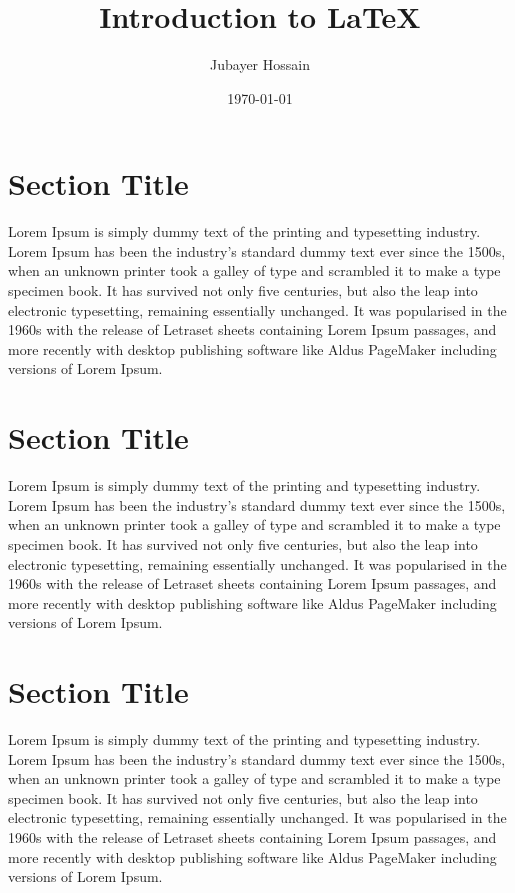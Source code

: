 \documentclass{article}
\title{Introduction to {\LaTeX}}
\author{Jubayer Hossain}
\date{\today}
\begin{document}
\maketitle 
\tableofcontents 

\section{Section Title} 
Lorem Ipsum is simply dummy text of the printing and typesetting industry. 
Lorem Ipsum has been the industry's standard dummy text ever since the 1500s, 
when an unknown printer took a galley of type and scrambled it to make a type 
specimen book. It has survived not only five centuries, but also the leap into 
electronic typesetting, remaining essentially unchanged. It was popularised in 
the 1960s with the release of Letraset sheets containing Lorem Ipsum passages, 
and more recently with desktop publishing software like Aldus PageMaker 
including versions of Lorem Ipsum.

\section{Section Title} 
Lorem Ipsum is simply dummy text of the printing and typesetting industry. 
Lorem Ipsum has been the industry's standard dummy text ever since the 1500s, 
when an unknown printer took a galley of type and scrambled it to make a type 
specimen book. It has survived not only five centuries, but also the leap into 
electronic typesetting, remaining essentially unchanged. It was popularised in 
the 1960s with the release of Letraset sheets containing Lorem Ipsum passages, 
and more recently with desktop publishing software like Aldus PageMaker 
including versions of Lorem Ipsum.

\section{Section Title} 
Lorem Ipsum is simply dummy text of the printing and typesetting industry. 
Lorem Ipsum has been the industry's standard dummy text ever since the 1500s, 
when an unknown printer took a galley of type and scrambled it to make a type 
specimen book. It has survived not only five centuries, but also the leap into 
electronic typesetting, remaining essentially unchanged. It was popularised in 
the 1960s with the release of Letraset sheets containing Lorem Ipsum passages, 
and more recently with desktop publishing software like Aldus PageMaker 
including versions of Lorem Ipsum.
\end{document}
